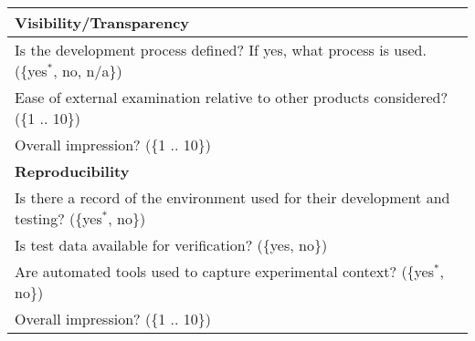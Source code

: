 \begin{longtable}{p{16cm}}
  \midrule
  \textbf{Visibility/Transparency}\\
  \midrule

  Is the development process defined? If yes, what process is used. (\{yes$^*$, no, n/a\})\\
  Ease of external examination relative to other products
  considered?  (\{1 .. 10\})\\
  Overall impression? (\{1 .. 10\})\\

  \midrule
  \textbf{Reproducibility}\\
  \midrule

  Is there a record of the environment used for their development and testing?
  (\{yes$^*$, no\})\\
  Is test data available for verification?  (\{yes, no\})\\
  Are automated tools used to capture experimental context?  (\{yes$^*$, no\})\\
  Overall impression? (\{1 .. 10\})\\

  \bottomrule

\end{longtable}
